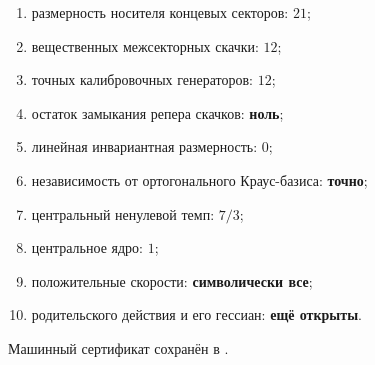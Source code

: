 \begin{protocol}
\begin{enumerate}
 \item размерность носителя концевых секторов: \textbf{$21$};
 \item вещественных межсекторных скачки: \textbf{$12$};
 \item точных калибровочных генераторов: \textbf{$12$};
 \item остаток замыкания репера скачков: \textbf{ноль};
 \item линейная инвариантная размерность: \textbf{$0$};
 \item независимость от ортогонального Краус-базиса: \textbf{точно};
 \item центральный ненулевой темп: \textbf{$7/3$};
 \item центральное ядро: \textbf{$1$};
 \item положительные скорости: \textbf{символически все};
 \item родительского действия и его гессиан: \textbf{ещё открыты}.
\end{enumerate}
\end{protocol}

Машинный сертификат сохранён в
.